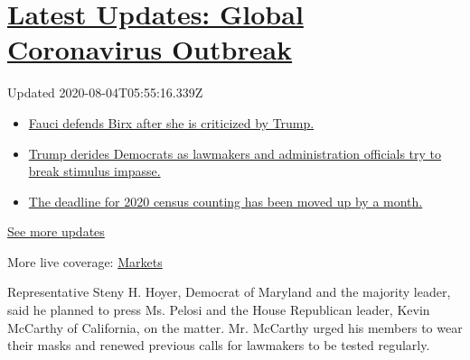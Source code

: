 \hypertarget{latest-updates-global-coronavirus-outbreak}{%
\section{\texorpdfstring{\href{https://www.nytimes.com/2020/08/03/world/coronavirus-covid-19.html?action=click\&pgtype=Article\&state=default\&region=MAIN_CONTENT_1\&context=storylines_live_updates}{Latest
Updates: Global Coronavirus
Outbreak}}{Latest Updates: Global Coronavirus Outbreak}}\label{latest-updates-global-coronavirus-outbreak}}

Updated 2020-08-04T05:55:16.339Z

\begin{itemize}
\tightlist
\item
  \href{https://www.nytimes.com/2020/08/03/world/coronavirus-covid-19.html?action=click\&pgtype=Article\&state=default\&region=MAIN_CONTENT_1\&context=storylines_live_updates\#link-4547638f}{Fauci
  defends Birx after she is criticized by Trump.}
\item
  \href{https://www.nytimes.com/2020/08/03/world/coronavirus-covid-19.html?action=click\&pgtype=Article\&state=default\&region=MAIN_CONTENT_1\&context=storylines_live_updates\#link-15e7f995}{Trump
  derides Democrats as lawmakers and administration officials try to
  break stimulus impasse.}
\item
  \href{https://www.nytimes.com/2020/08/03/world/coronavirus-covid-19.html?action=click\&pgtype=Article\&state=default\&region=MAIN_CONTENT_1\&context=storylines_live_updates\#link-e5a2cda}{The
  deadline for 2020 census counting has been moved up by a month.}
\end{itemize}

\href{https://www.nytimes.com/2020/08/03/world/coronavirus-covid-19.html?action=click\&pgtype=Article\&state=default\&region=MAIN_CONTENT_1\&context=storylines_live_updates}{See
more updates}

More live coverage:
\href{https://www.nytimes.com/live/2020/08/03/business/stock-market-today-coronavirus?action=click\&pgtype=Article\&state=default\&region=MAIN_CONTENT_1\&context=storylines_live_updates}{Markets}

Representative Steny H. Hoyer, Democrat of Maryland and the majority
leader, said he planned to press Ms. Pelosi and the House Republican
leader, Kevin McCarthy of California, on the matter. Mr. McCarthy urged
his members to wear their masks and renewed previous calls for lawmakers
to be tested regularly.

